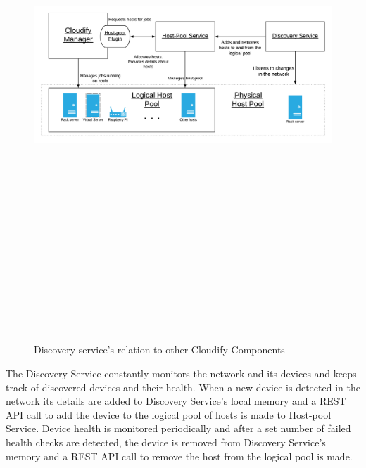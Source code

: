 \begin{figure}[ht!]
\centering
  \includegraphics[width=15cm,height=20cm, keepaspectratio]{Discovery_service.png}%
  \caption{Discovery service's relation to other Cloudify Components}
  \label{fig:discovery_service}
\end{figure}

The Discovery Service constantly monitors the network and its devices and keeps track of discovered devices and their health. When a new device is detected in the network its details are added to Discovery Service's local memory and a REST API call to add the device to the logical pool of hosts is made to Host-pool Service. Device health is monitored periodically and after a set number of failed health checks are detected, the device is removed from Discovery Service's memory and a REST API call to remove the host from the logical pool is made.